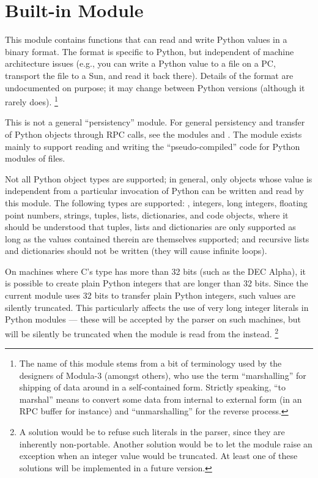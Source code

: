 \section{Built-in Module }
\label{module-marshal}

This module contains functions that can read and write Python
values in a binary format.  The format is specific to Python, but
independent of machine architecture issues (e.g., you can write a
Python value to a file on a PC, transport the file to a Sun, and read
it back there).  Details of the format are undocumented on purpose;
it may change between Python versions (although it rarely does).%
\footnote{The name of this module stems from a bit of terminology used
by the designers of Modula-3 (amongst others), who use the term
``marshalling'' for shipping of data around in a self-contained form.
Strictly speaking, ``to marshal'' means to convert some data from
internal to external form (in an RPC buffer for instance) and
``unmarshalling'' for the reverse process.}

This is not a general ``persistency'' module.  For general persistency
and transfer of Python objects through RPC calls, see the modules
 and .  The  module exists
mainly to support reading and writing the ``pseudo-compiled'' code for
Python modules of  files.

Not all Python object types are supported; in general, only objects
whose value is independent from a particular invocation of Python can
be written and read by this module.  The following types are supported:
, integers, long integers, floating point numbers,
strings, tuples, lists, dictionaries, and code objects, where it
should be understood that tuples, lists and dictionaries are only
supported as long as the values contained therein are themselves
supported; and recursive lists and dictionaries should not be written
(they will cause infinite loops).

 On machines where C's  type has more than
32 bits (such as the DEC Alpha), it
is possible to create plain Python integers that are longer than 32
bits.  Since the current  module uses 32 bits to
transfer plain Python integers, such values are silently truncated.
This particularly affects the use of very long integer literals in
Python modules --- these will be accepted by the parser on such
machines, but will be silently be truncated when the module is read
from the  instead.%
\footnote{A solution would be to refuse such literals in the parser,
since they are inherently non-portable.  Another solution would be to
let the  module raise an exception when an integer value
would be truncated.  At least one of these solutions will be
implemented in a future version.}


